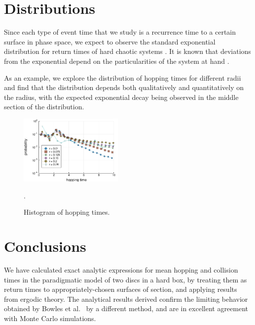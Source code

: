 \documentclass[superscriptaddress,pre,reprint,showpacs,twocolumn]{revtex4-1}
\newcommand{\etal}{et al.\ }
\begin{document}
%
\section{Distributions}

Since each type of event time that we study is a recurrence time to a
certain surface in phase space, we expect to observe the standard
exponential distribution for return times of hard chaotic systems
\cite{Hirata1999}. It is known that deviations from the
exponential depend on the particularities of the system at hand
\cite{Altmann2005}.


As an example, we explore
the distribution of hopping times for different radii and find that the
distribution depends both qualitatively and quantitatively on the
radius, with the expected exponential decay being observed in the middle section
of the distribution. 


\begin{figure}[h]
  \centering
  \includegraphics[width=0.45\textwidth]{figures/histogram_hopping_times.pdf}
  \caption{Histogram of hopping times.}
    \label{histogram_hopping}.
\end{figure}


\section{Conclusions}

We have calculated exact analytic expressions for mean hopping and
collision times in the paradigmatic model of two discs in a hard box,
by treating them as return times to  appropriately-chosen surfaces of section, 
and applying results from ergodic theory.
The analytical results derived 
confirm the limiting behavior obtained
by Bowles \etal \cite{Bowles04} by a different method, and are in excellent agreement with Monte Carlo simulations.
\end{document}
